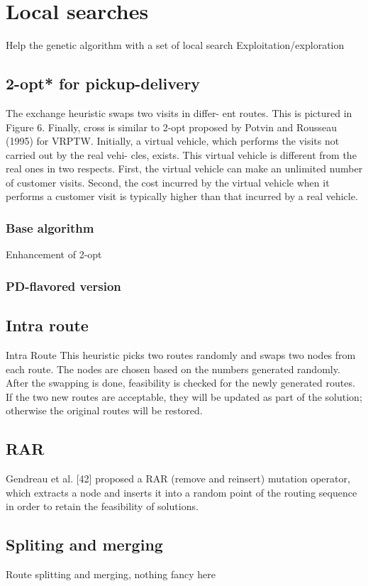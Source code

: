 \documentclass[12pt]{memoir}
\begin{document}
\section{Local searches}
Help the genetic algorithm with a set of local search
Exploitation/exploration
\subsection{2-opt* for pickup-delivery}
The exchange heuristic swaps two visits in differ-
ent routes. This is pictured in Figure 6. Finally, cross
is similar to 2-opt {\*}
proposed by Potvin and Rousseau
(1995) for VRPTW. Initially, a virtual vehicle, which
performs the visits not carried out by the real vehi-
cles, exists. This virtual vehicle is different from the
real  ones  in  two  respects.  First,  the  virtual  vehicle
can  make  an  unlimited  number  of  customer  visits.
Second, the cost incurred by the virtual vehicle when
it performs a customer visit is typically higher than
that incurred by a real vehicle.
\subsubsection{Base algorithm}
Enhancement of 2-opt
\subsubsection{PD-flavored version}

\subsection{Intra route}
Intra Route This heuristic picks two routes randomly and swaps two nodes from each route.
The nodes are chosen based on the numbers generated randomly. After the
swapping is done, feasibility is checked for the newly generated routes. If the
two new routes are acceptable, they will be updated as part of the solution;
otherwise the original routes will be restored.
\subsection{RAR}
Gendreau et al. [42] proposed a RAR (remove and
reinsert) mutation operator, which extracts a node and inserts it into a random point of
the routing sequence in order to retain the feasibility of solutions.
\subsection{Spliting and merging}
Route splitting and merging, nothing fancy here 
\end{document}
